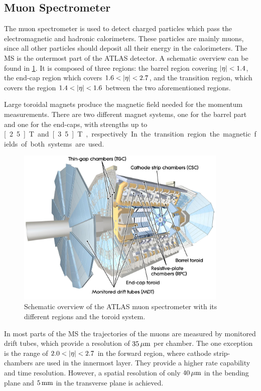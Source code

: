 \subsection{Muon Spectrometer}\label{sub:setup:muons}

The muon spectrometer is used to detect charged particles which pass the electromagnetic and hadronic calorimeters.
These particles are mainly muons, since all other particles should deposit all their energy in the calorimeters.
The MS is the outermost part of the ATLAS detector.
A schematic overview can be found in \cref{fig:setup:muon}.
It is composed of three regions: the barrel region covering $\left|\eta\right| < 1.4$, the end-cap region which covers $1.6 < \left|\eta\right| < 2.7$,
and the transition region, which covers the region $1.4 < \left|\eta\right| < 1.6$ between the two aforementioned regions.

Large toroidal magnets produce the magnetic field needed for the momentum measurements.
There are two different magnet systems, one for the barrel part and one for the end-caps, with strengths up to
\unit[2.5]{T} and \unit[3.5]{T}, respectively.
In the transition region the magnetic fields of both systems are used.

\begin{figure}[htb]
    \centering
    \includegraphics[width=0.9\textwidth]{./figures/setup/muon.jpg}
    \caption{Schematic overview of the ATLAS muon spectrometer with its different regions and the toroid system.~\cite{ImageMuon}}\label{fig:setup:muon}
\end{figure}

In most parts of the MS the trajectories of the muons are measured by monitored drift tubes,  which provide a resolution
of $\unit[35]{\mu m}$ per chamber.
The one exception is the range of $2.0 < \left|\eta\right| < 2.7$ in the forward region, where cathode strip-chambers are used
in the innermost layer.
They provide a higher rate capability and time resolution.
However, a spatial resolution of only $\unit[40]{\mu m}$ in the bending plane and $\unit[5]{mm}$ in the
transverse plane is achieved.

